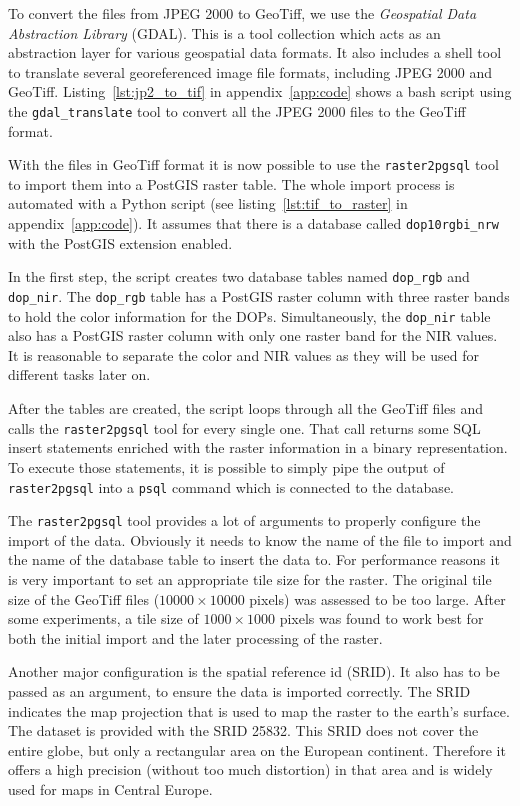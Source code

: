 To convert the files from JPEG 2000 to GeoTiff, we use the \emph{Geospatial Data Abstraction Library} (GDAL). This is a tool collection which acts as an abstraction layer for various geospatial data formats. It also includes a shell tool to translate several georeferenced image file formats, including JPEG 2000 and GeoTiff. Listing~\ref{lst:jp2_to_tif} in appendix~\ref{app:code} shows a bash script using the \texttt{gdal\_translate} tool to convert all the JPEG 2000 files to the GeoTiff format.

With the files in GeoTiff format it is now possible to use the \texttt{raster2pgsql} tool to import them into a PostGIS raster table. The whole import process is automated with a Python script (see listing~\ref{lst:tif_to_raster} in appendix~\ref{app:code}). It assumes that there is a database called \texttt{dop10rgbi\_nrw} with the PostGIS extension enabled.

In the first step, the script creates two database tables named \texttt{dop\_rgb} and \texttt{dop\_nir}. The \texttt{dop\_rgb} table has a PostGIS raster column with three raster bands to hold the color information for the DOPs. Simultaneously, the \texttt{dop\_nir} table also has a PostGIS raster column with only one raster band for the NIR values. It is reasonable to separate the color and NIR values as they will be used for different tasks later on.

After the tables are created, the script loops through all the GeoTiff files and calls the \texttt{raster2pgsql} tool for every single one. That call returns some SQL insert statements enriched with the raster information in a binary representation. To execute those statements, it is possible to simply pipe the output of \texttt{raster2pgsql} into a \texttt{psql} command which is connected to the database.

The \texttt{raster2pgsql} tool provides a lot of arguments to properly configure the import of the data. Obviously it needs to know the name of the file to import and the name of the database table to insert the data to. For performance reasons it is very important to set an appropriate tile size for the raster. The original tile size of the GeoTiff files ($10000\times 10000$ pixels) was assessed to be too large. After some experiments, a tile size of $1000\times 1000$ pixels was found to work best for both the initial import and the later processing of the raster.

Another major configuration is the spatial reference id (SRID). It also has to be passed as an argument, to ensure the data is imported correctly. The SRID indicates the map projection that is used to map the raster to the earth's surface. The dataset is provided with the SRID 25832. This SRID does not cover the entire globe, but only a rectangular area on the European continent. Therefore it offers a high precision (without too much distortion) in that area and is widely used for maps in Central Europe.

